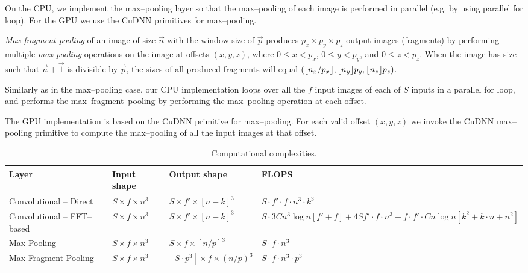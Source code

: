 \documentclass[conference]{IEEEtran}
\DeclarePairedDelimiter{\floor}{\lfloor}{\rfloor}
\begin{document}
  On the CPU, we implement the max--pooling layer so that the
  max--pooling of each image is performed in parallel (e.g. by using
  parallel for loop).  For the GPU we use the CuDNN primitives for
  max--pooling.

  \emph{Max fragment pooling} of an image of size $\vec{n}$ with the
  window size of $\vec{p}$ produces $p_x \times p_y \times p_z$ output
  images (fragments) by performing multiple \emph{max pooling}
  operations on the image at offsets $(x,y,z)$, where $0 \le x < p_x$,
  $0 \le y < p_y$, and $0 \le z < p_z$.  When the image has size such
  that $\vec{n} + \vec{1}$ is divisible by $\vec{p}$, the sizes of all
  produced fragments will equal
  $(\floor{n_x/p_x},\floor{n_y}{p_y},\floor{n_z}{p_z})$.

  Similarly as in the max--pooling case, our CPU implementation loops
  over all the $f$ input images of each of $S$ inputs in a parallel
  for loop, and performs the max--fragment--pooling by performing the
  max--pooling operation at each offset.

  The GPU implementation is based on the CuDNN primitive for
  max--pooling.  For each valid offset $(x,y,z)$ we invoke the CuDNN
  max--pooling primitive to compute the max--pooling of all the input
  images at that offset.


  \begin{table}[t]
    \centering
    \begin{tabular}{l|lll}
      \toprule
      Layer   & Input shape    & Output shape     & FLOPS \\
      \midrule
      Convolutional -- Direct &
      $S \times f \times n^3$ &
      $S \times f' \times [n-k]^3$ &
      $S \cdot f' \cdot f \cdot n^3 \cdot k^3$ \\
      Convolutional -- FFT--based &
      $S \times f \times n^3$ &
      $S \times f' \times [n-k]^3$ &
      $S \cdot 3Cn^3 \log n[f' + f] + 4Sf' \cdot f \cdot n^3 + f \cdot f' \cdot Cn \log n[k^2 + k \cdot n + n^2]$ \\
      Max Pooling &
      $S \times f \times n^3$ &
      $S \times f \times [n/p]^3$ &
      $S \cdot f \cdot n^3$ \\
      Max Fragment Pooling &
      $S \times f \times n^3$ &
      $[S \cdot p^3] \times f \times (n/p)^3$ &
      $S \cdot f \cdot n^3 \cdot p^3$ \\
      \bottomrule
    \end{tabular}
    \caption{Computational complexities.}
    \label{table:layers_complexity}
  \end{table}
\end{document}
